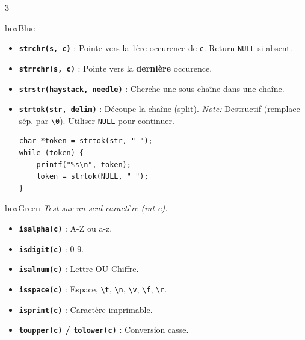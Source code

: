\documentclass[10pt,landscape,a4paper]{article}
\begin{document}
\begin{multicols*}{3}
\begin{mybox}{boxBlue}
    \begin{itemize}[leftmargin=*, noitemsep]
        \item \textbf{\texttt{strchr(s, c)}} : Pointe vers la 1ère occurence de \texttt{c}. Return \texttt{NULL} si absent.
        \item \textbf{\texttt{strrchr(s, c)}} : Pointe vers la \textbf{dernière} occurence.
        \item \textbf{\texttt{strstr(haystack, needle)}} : Cherche une sous-chaîne dans une chaîne.
        \item \textbf{\texttt{strtok(str, delim)}} : Découpe la chaîne (split).
            \textit{Note:} Destructif (remplace sép. par \texttt{\textbackslash0}). Utiliser \texttt{NULL} pour continuer.
            \begin{lstlisting}
char *token = strtok(str, " ");
while (token) {
    printf("%s\n", token);
    token = strtok(NULL, " ");
}
            \end{lstlisting}
    \end{itemize}
\end{mybox}

\begin{mybox}{boxGreen}
    \textit{Test sur un seul caractère (int c).}
    \begin{itemize}[leftmargin=*, noitemsep]
        \item \textbf{\texttt{isalpha(c)}} : A-Z ou a-z.
        \item \textbf{\texttt{isdigit(c)}} : 0-9.
        \item \textbf{\texttt{isalnum(c)}} : Lettre OU Chiffre.
        \item \textbf{\texttt{isspace(c)}} : Espace, \texttt{\textbackslash t}, \texttt{\textbackslash n}, \texttt{\textbackslash v}, \texttt{\textbackslash f}, \texttt{\textbackslash r}.
        \item \textbf{\texttt{isprint(c)}} : Caractère imprimable.
        \item \textbf{\texttt{toupper(c)} / \texttt{tolower(c)}} : Conversion casse.
    \end{itemize}
\end{mybox}


\end{multicols*}
\end{document}
